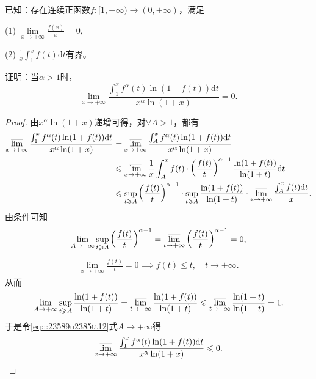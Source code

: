 \documentclass[../../main.tex]{subfiles}%
\begin{document}
\begin{example}
已知：存在连续正函数\( f : [1, +\infty) \to (0, +\infty) \)，满足

(1) \( \lim\limits_{x \to +\infty} \frac{f(x)}{x} = 0 \),

(2) \( \frac{1}{x} \int_1^x f(t)\mathrm{d}t \)有界。

证明：当\( \alpha > 1 \)时，
\[
\lim_{x \to +\infty} \frac{\int_1^x f^\alpha(t) \ln(1 + f(t))\mathrm{d}t}{x^\alpha \ln(1 + x)} = 0.
\]
\end{example}
\begin{proof}
由\( x^{\alpha}\ln(1 + x) \)递增可得，对\( \forall A > 1 \)，都有
\begin{align}
\varlimsup_{x \to +\infty} \frac{\int_1^x f^{\alpha}(t)\ln(1 + f(t))\mathrm{d}t}{x^{\alpha}\ln(1 + x)} &= \varlimsup_{x \to +\infty} \frac{\int_A^x f^{\alpha}(t)\ln(1 + f(t))\mathrm{d}t}{x^{\alpha}\ln(1 + x)}  \nonumber \\
&\leqslant \varlimsup_{x \to +\infty} \frac{1}{x} \int_A^x f(t) \cdot \left( \frac{f(t)}{t} \right)^{\alpha - 1} \frac{\ln(1 + f(t))}{\ln(1 + t)}\mathrm{d}t \nonumber \\
&\leqslant \sup_{t \geqslant A} \left( \frac{f(t)}{t} \right)^{\alpha - 1} \cdot \sup_{t \geqslant A} \frac{\ln(1 + f(t))}{\ln(1 + t)} \cdot \varlimsup_{x \to +\infty} \frac{\int_A^x f(t)\mathrm{d}t}{x}. \label{eq:::23589u2385tt12}
\end{align}
由条件可知
\begin{align*}
\lim_{A \to +\infty} \sup_{t \geqslant A} \left( \frac{f(t)}{t} \right)^{\alpha - 1} = \varlimsup_{t \to +\infty} \left( \frac{f(t)}{t} \right)^{\alpha - 1} = 0,
\end{align*}
\begin{align*}
\lim_{x \to +\infty} \frac{f(t)}{t} = 0 \implies f(t) \leqslant t, \quad t \to +\infty.
\end{align*}
从而
\begin{align*}
\lim_{A \to +\infty} \sup_{t \geqslant A} \frac{\ln(1 + f(t))}{\ln(1 + t)} = \varlimsup_{t \to +\infty} \frac{\ln(1 + f(t))}{\ln(1 + t)} \leqslant \varlimsup_{t \to +\infty} \frac{\ln(1 + t)}{\ln(1 + t)} = 1.
\end{align*}
于是令\eqref{eq:::23589u2385tt12}式\( A \to +\infty \)得
\begin{align*}
\varlimsup_{x \to +\infty} \frac{\int_1^x f^{\alpha}(t)\ln(1 + f(t))\mathrm{d}t}{x^{\alpha}\ln(1 + x)} \leqslant 0.
\end{align*}
\end{proof}
\end{document}
